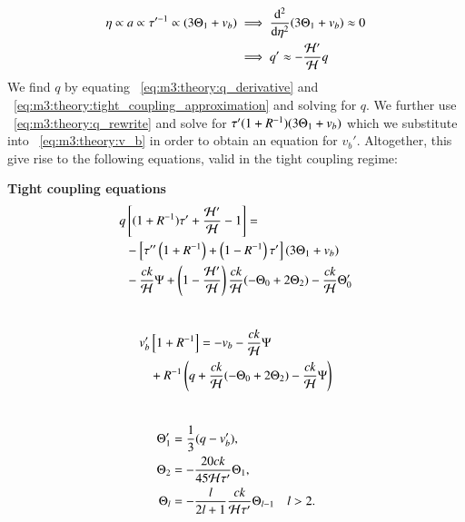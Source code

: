     \begin{equation}\label{eq:m3:theory:tight_coupling_approximation}
        \begin{split}
        \eta\propto a\propto \tau'^{-1}\propto(3\Theta_1+v_b) &\implies \dv[2]{\eta}(3\Theta_1+v_b)\approx 0 \\
        &\implies q' \approx -\frac{\mathcal{H}'}{\mathcal{H}}q
        \end{split}
    \end{equation}
    We find $q$ by equating ~\cref{eq:m3:theory:q_derivative} and ~\cref{eq:m3:theory:tight_coupling_approximation} and solving for $q$. We further use ~\cref{eq:m3:theory:q_rewrite} and solve for $\tau'(1+R^{-1})(3\Theta_1+v_b)$ which we substitute into ~\cref{eq:m3:theory:v_b} in order to obtain an equation for $v_b'$. Altogether, this give rise to the following equations, valid in the tight coupling regime:
    \begin{tcolorbox}[
        width=1.025\linewidth,
        colback=blue!5!white,
        colframe=white
    ]
    \textbf{Tight coupling equations}
    \begin{equation}\label{eq:m3:theory:tight_coupling_q}
        \begin{split}
            q&\left[(1+R^{-1})\tau'+\frac{\mathcal{H}'}{\mathcal{H}}-1\right] = \\
            &- \left[\tau''\left(1+R^{-1}\right)+\left(1-R^{-1}\right)\tau'\right](3\Theta_1+v_b) \\
            &- \frac{ck}{\mathcal{H}}\Psi+\left(1-\frac{\mathcal{H}'}{\mathcal{H}}\right)\frac{ck}{\mathcal{H}}(-\Theta_0+2\Theta_2)-\frac{ck}{\mathcal{H}}\Theta_0'
        \end{split}
    \end{equation}
    \\
    \begin{equation}\label{eq:m3:theory:tight_coupling_v_b}
        \begin{split}
            v_b'&\left[1+R^{-1}\right] = -v_b-\frac{ck}{\mathcal{H}}\Psi\\
            &+R^{-1}\left(q+\frac{ck}{\mathcal{H}}(-\Theta_0+2\Theta_2)-\frac{ck}{\mathcal{H}}\Psi\right)
        \end{split}
    \end{equation}
    \\
    \begin{subequations}\label{eq:m3:theory:tight_coupling_all_poles}
        \begin{align}
            \Theta_1' &= \frac{1}{3}(q-v_b'), \label{eq:m3:theory:tight_coupling_monopole}\\
            \Theta_2 &= -\frac{20ck}{45\mathcal{H}\tau'}\Theta_1, \label{eq:m3:theory:tight_coupling_dipole}\\
            \Theta_l &= -\frac{l}{2l+1}\frac{ck}{\mathcal{H}\tau'}\Theta_{l-1} \quad l>2. \label{eq:m3:theory:tight_coupling_multipole}
        \end{align}
    \end{subequations}
    \end{tcolorbox}

